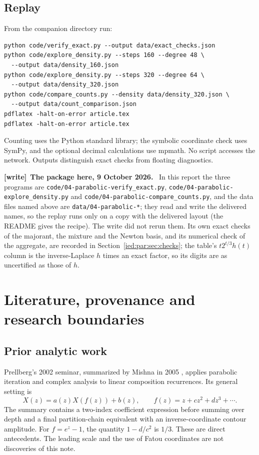 \documentclass[11pt,letterpaper]{article}
\theoremstyle{remark}\newtheorem{remark}[theorem]{Remark}
\newcommand{\file}[1]{\nolinkurl{#1}}
\newenvironment{writenote}[1][]{\par\smallskip\begingroup\small
 \noindent\textbf{[write]}\if\relax\detokenize{#1}\relax\else~\textbf{#1.}\fi\ }%
 {\par\endgroup\smallskip}
\begin{document}
\subsection{Replay}
From the companion directory run:
\begin{verbatim}
python code/verify_exact.py --output data/exact_checks.json
python code/explore_density.py --steps 160 --degree 48 \
  --output data/density_160.json
python code/explore_density.py --steps 320 --degree 64 \
  --output data/density_320.json
python code/compare_counts.py --density data/density_320.json \
  --output data/count_comparison.json
pdflatex -halt-on-error article.tex
pdflatex -halt-on-error article.tex
\end{verbatim}
Counting uses the Python standard library; the symbolic coordinate
check uses SymPy, and the optional decimal calculations use mpmath.
No script accesses the network. Outputs distinguish exact checks
from floating diagnostics.
\begin{writenote}[The package here, 9 October 2026]
In this report the three programs are \file{code/04-parabolic-verify_exact.py},
\file{code/04-parabolic-explore_density.py} and
\file{code/04-parabolic-compare_counts.py}, and the data files named above are
\file{data/04-parabolic-*}; they read and write the delivered names, so the
replay runs only on a copy with the delivered layout (the README gives the
recipe). The write did not rerun them. Its own exact checks of the majorant,
the mixture and the Newton basis, and its numerical check of the aggregate, are
recorded in Section~\ref{ied:par:sec:checks}; the table's
$t2^{t/3}h(t)$ column is the inverse-Laplace $h$ times an exact factor, so its
digits are as uncertified as those of $h$.
\end{writenote}

\section{Literature, provenance and research boundaries}\label{ied:par:sec:literature}

\subsection{Prior analytic work}
Prellberg's 2002 seminar, summarized by Mishna in 2005
\cite{Prellberg}, applies parabolic iteration and complex analysis to
linear composition recurrences. Its general setting is
\[
 X(z)=a(z)X(f(z))+b(z),\qquad
 f(z)=z+cz^2+dz^3+\cdots.
\]
The summary contains a two-index coefficient expression before
summing over depth and a final partition-chain equivalent with an
inverse-coordinate contour amplitude. For $f=e^z-1$, the quantity
$1-d/c^2$ is $1/3$. These are direct antecedents. The leading scale
and the use of Fatou coordinates are not discoveries of this note.
\end{document}
